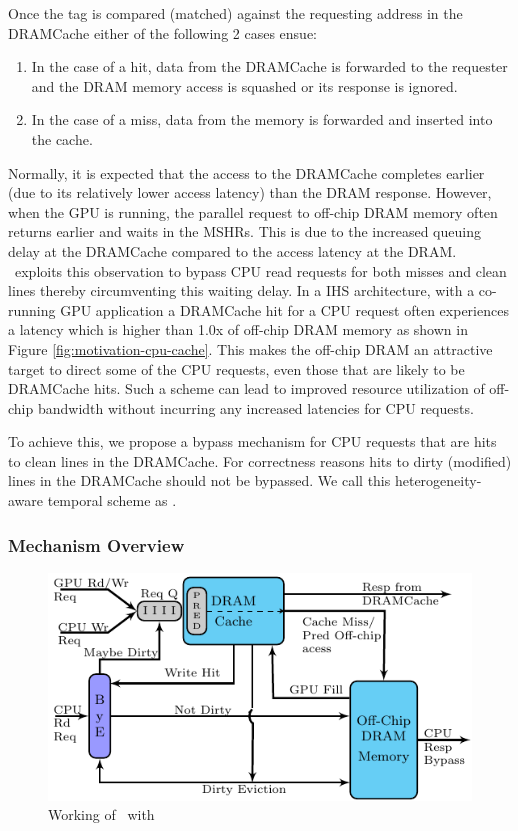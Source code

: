 Once the tag is compared (matched) against the requesting address in the DRAMCache either of the following 2 cases ensue: 
\begin{enumerate}[label=(\alph*)]
	\item In the case of a hit, data from the DRAMCache is forwarded to the requester and the DRAM memory access is squashed or its response is ignored. 
	\item In the case of a miss, data from the memory is forwarded and inserted into the cache.
\end{enumerate}
Normally, it is expected that the access to the DRAMCache completes earlier (due to its relatively lower access latency) than the DRAM response. However, when the GPU is running, the parallel request to off-chip DRAM memory often returns earlier and waits in the MSHRs. This is due to the increased queuing delay at the DRAMCache compared to the access latency at the DRAM. \cachename\ exploits this observation to bypass CPU read requests for both misses and clean lines thereby circumventing this waiting delay.
In a IHS architecture, with a co-running GPU application a DRAMCache hit for a CPU request often experiences a latency which is higher than 1.0x of off-chip DRAM memory as shown in Figure \ref{fig:motivation-cpu-cache}. 
This makes the off-chip DRAM an attractive target to direct some of the CPU requests, even those that are likely to be DRAMCache hits. Such a scheme can lead to improved resource utilization of off-chip bandwidth without incurring any increased latencies for CPU requests.
\par To achieve this, we propose a bypass mechanism for CPU requests that are hits to clean lines in the DRAMCache. For correctness reasons hits to dirty (modified) lines in the DRAMCache should not be bypassed. We call this heterogeneity-aware temporal scheme as \bypassname.


\subsubsection{Mechanism Overview}

\begin{figure}[htb]
	\centering
	\includegraphics[scale=1.5]{figures/bloom}	
	\caption{Working of \cachename\ with \bypassname}
	\label{fig:bye}
\end{figure}

